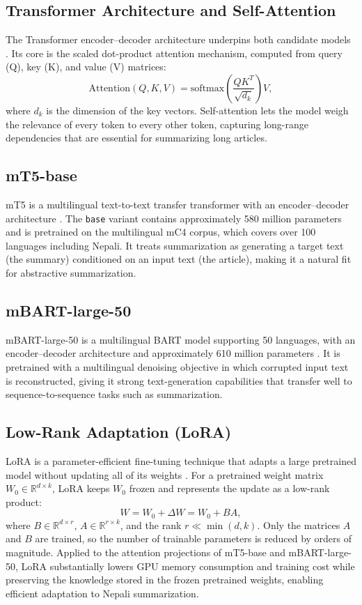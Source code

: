 \documentclass[12pt]{report}
\begin{document}
\subsection{Transformer Architecture and Self-Attention}
The Transformer encoder--decoder architecture underpins both candidate models \cite{vaswani2017attention}. Its core is the scaled dot-product attention mechanism, computed from query (Q), key (K), and value (V) matrices:
\begin{equation}
\mathrm{Attention}(Q,K,V) = \mathrm{softmax}\!\left(\frac{QK^{T}}{\sqrt{d_k}}\right)V,
\end{equation}
where $d_k$ is the dimension of the key vectors. Self-attention lets the model weigh the relevance of every token to every other token, capturing long-range dependencies that are essential for summarizing long articles.

\subsection{mT5-base}
mT5 is a multilingual text-to-text transfer transformer with an encoder--decoder architecture \cite{xue2021mt5}. The \texttt{base} variant contains approximately 580 million parameters and is pretrained on the multilingual mC4 corpus, which covers over 100 languages including Nepali. It treats summarization as generating a target text (the summary) conditioned on an input text (the article), making it a natural fit for abstractive summarization.

\subsection{mBART-large-50}
mBART-large-50 is a multilingual BART model supporting 50 languages, with an encoder--decoder architecture and approximately 610 million parameters \cite{tang2020multilingual, liu2020multilingual}. It is pretrained with a multilingual denoising objective in which corrupted input text is reconstructed, giving it strong text-generation capabilities that transfer well to sequence-to-sequence tasks such as summarization.

\subsection{Low-Rank Adaptation (LoRA)}
LoRA is a parameter-efficient fine-tuning technique that adapts a large pretrained model without updating all of its weights \cite{hu2021lora}. For a pretrained weight matrix $W_0 \in \mathbb{R}^{d \times k}$, LoRA keeps $W_0$ frozen and represents the update as a low-rank product:
\begin{equation}
W = W_0 + \Delta W = W_0 + BA,
\end{equation}
where $B \in \mathbb{R}^{d \times r}$, $A \in \mathbb{R}^{r \times k}$, and the rank $r \ll \min(d,k)$. Only the matrices $A$ and $B$ are trained, so the number of trainable parameters is reduced by orders of magnitude. Applied to the attention projections of mT5-base and mBART-large-50, LoRA substantially lowers GPU memory consumption and training cost while preserving the knowledge stored in the frozen pretrained weights, enabling efficient adaptation to Nepali summarization.
\end{document}
